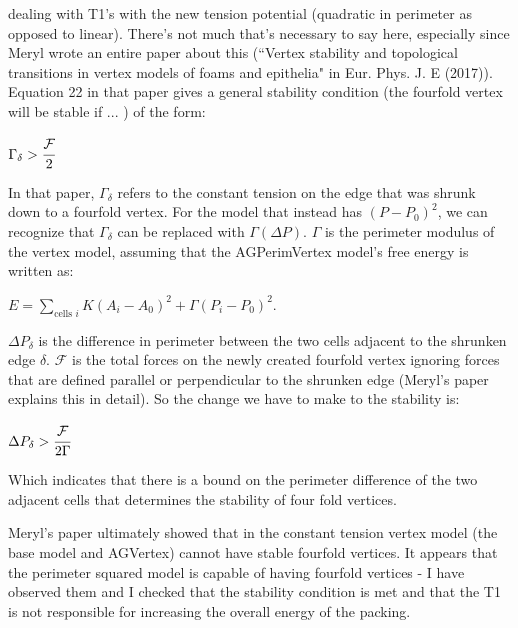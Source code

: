 \documentclass[12pt,a4paper]{article}
\begin{document}
                                                                                                                                                             dealing with T1's with the new tension potential (quadratic in perimeter as opposed to linear). There's not much that's necessary to say here, especially since Meryl wrote an entire paper about this (``Vertex stability and topological transitions in vertex models of foams and epithelia" in Eur. Phys. J. E (2017)). Equation 22 in that paper gives a general stability condition (the fourfold vertex will be stable if ... ) of the form:

\begin{center}
	\begin{math}
		\Gamma_\delta > \cfrac{\mathcal{F}}{2}
	\end{math}
\end{center}

In that paper, $\Gamma_\delta$ refers to the constant tension on the edge that was shrunk down to a fourfold vertex. For the model that instead has $(P-P_0)^2$, we can recognize that $\Gamma_\delta$ can be replaced with $\Gamma ( \Delta P)$. $\Gamma$ is the perimeter modulus of the vertex model, assuming that the AGPerimVertex model's free energy is written as:

\begin{center}
	\begin{math}
		E = \sum\limits_{\text{cells } i} K (A_i - A_0)^2 + \Gamma ( P_i - P_0 )^2. 
	\end{math}
\end{center} 

$\Delta P_{\delta}$ is the difference in perimeter between the two cells adjacent to the shrunken edge $\delta$. $\mathcal{F}$ is the total forces on the newly created fourfold vertex ignoring forces that are defined parallel or perpendicular to the shrunken edge (Meryl's paper explains this in detail). So the change we have to make to the stability is:

\begin{center}
	\begin{math}
		\Delta P_{\delta} > \cfrac{\mathcal{F}}{2 \Gamma}
	\end{math}
\end{center}
Which indicates that there is a bound on the perimeter difference of the two adjacent cells that determines the stability of four fold vertices. 

Meryl's paper ultimately showed that in the constant tension vertex model (the base model and AGVertex) cannot have stable fourfold vertices. It appears that the perimeter squared model is capable of having fourfold vertices - I have observed them and I checked that the stability condition is met and that the T1 is not responsible for increasing the overall energy of the packing. 
\end{document}
